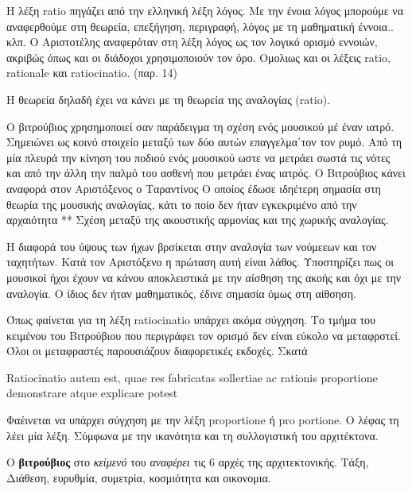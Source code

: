Η λέξη ratio πηγάζει από την ελληνική λέξη λόγος. Με την ένοια λόγος μπορούμε
να αναφερθούμε στη θεωρεία, επεξήγηση, περιγραφή, λόγος με τη μαθηματική
έννοια.. κλπ. Ο Αριστοτέλης αναφερόταν στη λέξη λόγος ως τον λογικό ορισμό
εννοιών, ακριβώς όπως και οι διάδοχοι χρησιμοποιούν τον όρο. Ομολιως και οι
λέξεις ratio, rationale και ratiocinatio. (παρ. 14)

Η θεωρεία δηλαδή έχει να κάνει με τη θεωρεία της αναλογίας (ratio). 

Ο βιτρούβιος χρησημοποιεί σαν παράδειγμα τη σχέση ενός μουσικού μέ έναν ιατρό.
Σημειώνει ως κοινό στοιχείο μεταξύ των δύο αυτών επαγγελμα΄τον τον ρυμό. Από τη
μία πλευρά την κίνηση του ποδιού ενός μουσικού ωστε να μετράει σωστά τις νότες
και από την άλλη την παλμό του ασθενή που μετράει ένας ιατρός. Ο Βιτρούβιος
κάνει αναφορά στον Αριστόξενος ο Ταραντίνος Ο οποίος έδωσε ιδηέτερη σημασία στη
θεωρία της μουσικής αναλογίας, κάτι το ποίο δεν ήταν εγκεκριμένο από την
αρχαιότητα ** Σχέση μεταξύ της ακουστικής αρμονίας και της χωρικής αναλογίας. 

Η διαφορά του ύψους των ήχων βρσίκεται στην αναλογία των νούμεεων και τον
ταχητήτων. Κατά τον Αριστόξενο η πρώταση αυτή είναι λάθος. Υποστηρίζει πως οι
μουσικοί ήχοι έχουν να κάνου αποκλειστικά με την αίσθηση της ακοής και όχι με
την αναλογία. Ο ίδιος δεν ήταν μαθηματικός, έδινε σημασία όμως στη αίθσηση. 

Όπως φαίνεται για τη λέξη ratiocinatio υπάρχει ακόμα σύγχηση. Το τμήμα του
κειμένου του Βιτρούβιου που περιγράφει τον ορισμό δεν είναι εύκολο να
μεταφρστεί. Όλοι οι μεταφραστές παρουσιάζουν διαφορετικές εκδοχές. Σκατά

Ratiocinatio autem est, quae res fabricatas sollertiae ac rationis proportione
demonstrare atque explicare potest

Φαέινεται να υπάρχει σύγχηση με την λέξη proportione ή pro portione. Ο λέφας
τη λέει μία λέξη. 
Σύμφωνα με την ικανότητα και τη συλλογιστική του αρχιτέκτονα.


  
  Ο {\color{red}\textbf{βιτρούβιος}} στο \emph{κείμενό} του \textit{αναφέρει} τις 6 αρχές της αρχιτεκτονικής. Τάξη, Διάθεση, ευρυθμία, συμετρία, κοσμιότητα και οικονομια. \cite{scranton_vitruvius_1974, vitruvius-lefas}
  
